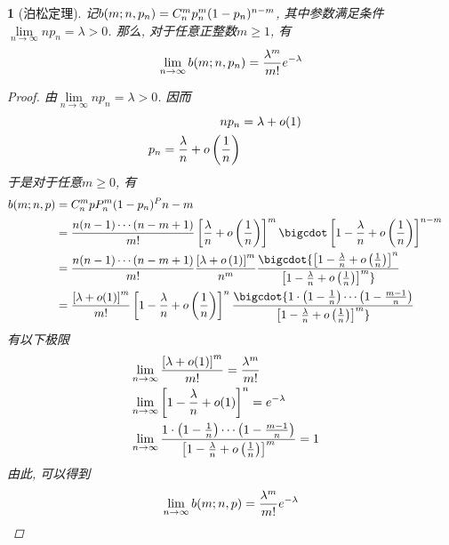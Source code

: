 \newtheorem{poisson_theorem}[theorem_root]{\theorem}
\begin{poisson_theorem}[泊松定理]
记\(b(m; n,p_n) = C_{n}^{m}p^m_n(1-p_n)^{n-m}\), 其中参数满足条件
\(\lim\limits_{n\to\infty}np_n = \lambda > 0\). 那么, 对于任意正整数\(m\ge 1\),
有
\begin{align}
\lim\limits_{n\to\infty}b(m; n, p_n) = {\lambda^m\over m!}e^{-\lambda}
\end{align}
\begin{proof}
由\(\lim\limits_{n\to\infty}np_n = \lambda > 0\). 因而
\begin{align}
    np_n &= \lambda + o(1)\cr
    p_n = {\lambda\over n} + o\left({1\over n}\right)
\end{align}
于是对于任意\(m\ge 0\), 有
\begin{align}
    b(m; n, p) &= \cbnt{n}{m}pP^m_n(1-p_n)^P{n-m}\cr
    &= {n(n-1)\cdots(n-m+1)\over m!}\left[{\lambda\over n} + o\left(1\over n\right)\right]^m\bigcdot\left[1-{\lambda\over n} + o\left({1\over n}\right)\right]^{n-m}\cr
    &= {n(n-1)\cdots(n-m+1)\over m!}{\left[\lambda + o\left(1\right)\right]^m\over n^m}\bigcdot{\left[1-{\lambda\over n} + o\left({1\over n}\right)\right]^{n}\over\left[1-{\lambda\over n} + o\left({1\over n}\right)\right]^{m}}\cr
    &= {\left[\lambda + o(1)\right]^m\over m!}\left[1-{\lambda\over n} + o\left({1\over n}\right)\right]^n\bigcdot{1\cdot\left(1-{1\over n}\right)\cdots\left(1-{m - 1\over n}\right)\over \left[1-{\lambda\over n} + o\left({1\over n}\right)\right]^m}
\end{align}
有以下极限
\begin{align}
&\lim\limits_{n\to\infty}{\left[\lambda + o(1)\right]^m\over m!} = {\lambda^m\over m!}\cr
&\lim\limits_{n\to\infty}\left[1 - {\lambda\over n} + o(1)\right]^n = e^{-\lambda}\cr
&\lim\limits_{n\to\infty}{1\cdot\left(1 - {1\over n}\right)\cdots\left(1 - {m - 1\over n}\right)\over \left[1 - {\lambda\over n} + o\left({1\over n}\right)\right]^m} = 1
\end{align}
由此, 可以得到
\begin{align}
\lim\limits_{n\to\infty}b(m;n,p) = {\lambda^m\over m!}e^{-\lambda}
\end{align}
\end{proof}
\end{poisson_theorem}

